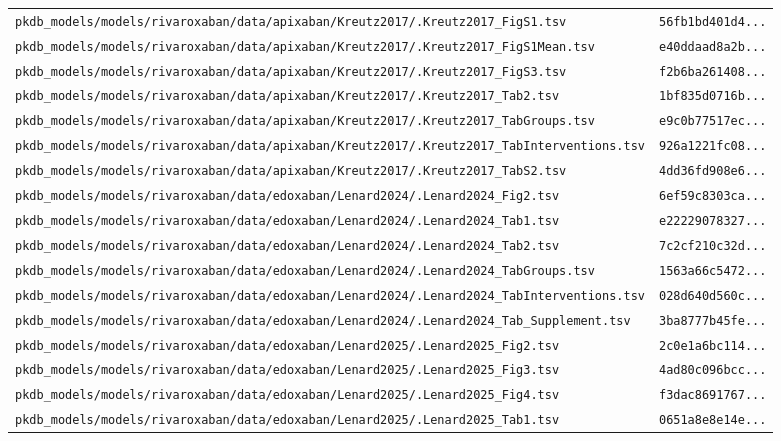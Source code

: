 \begin{longtable}{ll}
\texttt{pkdb\_models/models/rivaroxaban/data/apixaban/Kreutz2017/.Kreutz2017\_FigS1.tsv} & \texttt{56fb1bd401d4...} \\
\texttt{pkdb\_models/models/rivaroxaban/data/apixaban/Kreutz2017/.Kreutz2017\_FigS1Mean.tsv} & \texttt{e40ddaad8a2b...} \\
\texttt{pkdb\_models/models/rivaroxaban/data/apixaban/Kreutz2017/.Kreutz2017\_FigS3.tsv} & \texttt{f2b6ba261408...} \\
\texttt{pkdb\_models/models/rivaroxaban/data/apixaban/Kreutz2017/.Kreutz2017\_Tab2.tsv} & \texttt{1bf835d0716b...} \\
\texttt{pkdb\_models/models/rivaroxaban/data/apixaban/Kreutz2017/.Kreutz2017\_TabGroups.tsv} & \texttt{e9c0b77517ec...} \\
\texttt{pkdb\_models/models/rivaroxaban/data/apixaban/Kreutz2017/.Kreutz2017\_TabInterventions.tsv} & \texttt{926a1221fc08...} \\
\texttt{pkdb\_models/models/rivaroxaban/data/apixaban/Kreutz2017/.Kreutz2017\_TabS2.tsv} & \texttt{4dd36fd908e6...} \\
\texttt{pkdb\_models/models/rivaroxaban/data/edoxaban/Lenard2024/.Lenard2024\_Fig2.tsv} & \texttt{6ef59c8303ca...} \\
\texttt{pkdb\_models/models/rivaroxaban/data/edoxaban/Lenard2024/.Lenard2024\_Tab1.tsv} & \texttt{e22229078327...} \\
\texttt{pkdb\_models/models/rivaroxaban/data/edoxaban/Lenard2024/.Lenard2024\_Tab2.tsv} & \texttt{7c2cf210c32d...} \\
\texttt{pkdb\_models/models/rivaroxaban/data/edoxaban/Lenard2024/.Lenard2024\_TabGroups.tsv} & \texttt{1563a66c5472...} \\
\texttt{pkdb\_models/models/rivaroxaban/data/edoxaban/Lenard2024/.Lenard2024\_TabInterventions.tsv} & \texttt{028d640d560c...} \\
\texttt{pkdb\_models/models/rivaroxaban/data/edoxaban/Lenard2024/.Lenard2024\_Tab\_Supplement.tsv} & \texttt{3ba8777b45fe...} \\
\texttt{pkdb\_models/models/rivaroxaban/data/edoxaban/Lenard2025/.Lenard2025\_Fig2.tsv} & \texttt{2c0e1a6bc114...} \\
\texttt{pkdb\_models/models/rivaroxaban/data/edoxaban/Lenard2025/.Lenard2025\_Fig3.tsv} & \texttt{4ad80c096bcc...} \\
\texttt{pkdb\_models/models/rivaroxaban/data/edoxaban/Lenard2025/.Lenard2025\_Fig4.tsv} & \texttt{f3dac8691767...} \\
\texttt{pkdb\_models/models/rivaroxaban/data/edoxaban/Lenard2025/.Lenard2025\_Tab1.tsv} & \texttt{0651a8e8e14e...} \\

\end{longtable}
